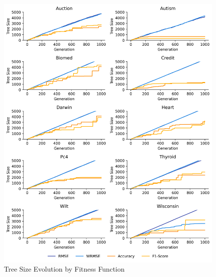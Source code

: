 
    \begin{figure}[h]
    \centering
    \includegraphics[width=\linewidth]{../Latex/Chapters/Figures/Results/fitness_tree_size_evolution.png}
    \caption{Tree Size Evolution by Fitness Function}
    \label{fig:tree_size_evolution}
    \end{figure}
    